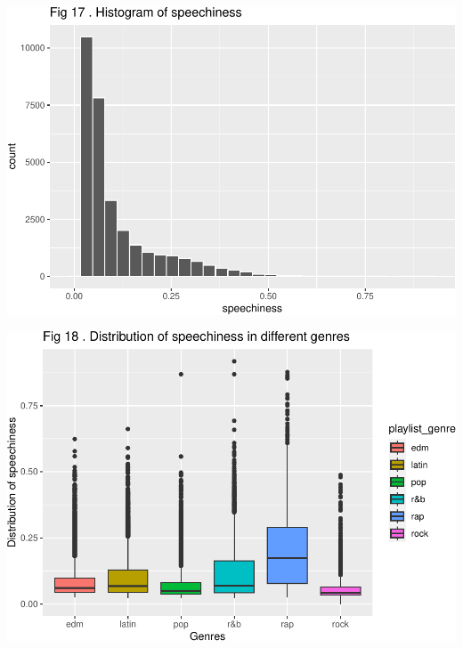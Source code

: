\documentclass[
]{article}
\begin{document}
\includegraphics{Final-Report_files/figure-latex/unnamed-chunk-14-13.pdf}

\includegraphics{Final-Report_files/figure-latex/unnamed-chunk-14-14.pdf}
\end{document}
